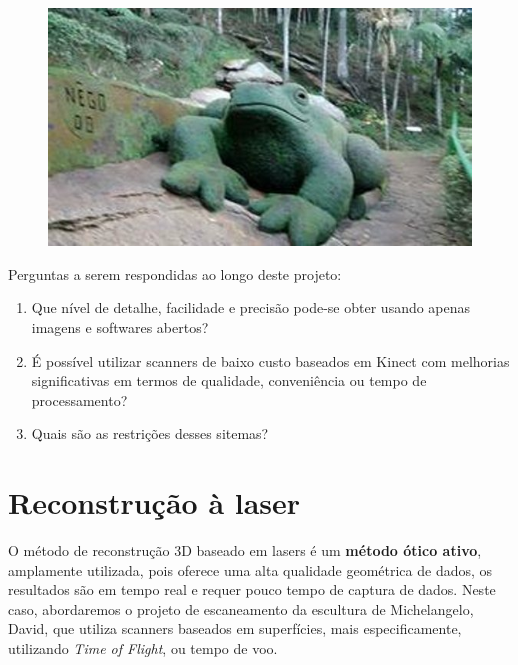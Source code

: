 \documentclass[table, usenames, svgnames, xcolor=dvipsnames]{beamer}
\begin{document}
\begin{frame} 
	\begin{figure}[!h]
		\centering
		\includegraphics[width=0.7\linewidth]{figs/jardim-do-nego32.jpg}
	\end{figure}
\end{frame}

\begin{frame}

Perguntas a serem respondidas ao longo deste projeto:

	\begin{enumerate}
	\item {Que nível de detalhe, facilidade e precisão pode-se obter usando apenas imagens e softwares abertos?}
	\item {É possível utilizar scanners de baixo custo baseados em Kinect com melhorias significativas em termos de qualidade, conveniência ou tempo de processamento?}
	\item {Quais são as restrições desses sitemas?}
	\end{enumerate}
	
\end{frame}

\section{Reconstrução à laser}

\begin{frame} 
	\begin{center}
	O método de reconstrução 3D baseado em lasers é um \textbf{método ótico ativo}, amplamente utilizada, pois oferece uma alta qualidade geométrica de dados, os resultados são em tempo real e requer pouco tempo de captura de dados.
Neste caso, abordaremos o projeto de escaneamento da escultura de Michelangelo, David, que utiliza scanners baseados em superfícies, mais especificamente, utilizando \emph{Time of Flight}, ou tempo de voo.
	\end{center}
\end{frame}
\end{document}

